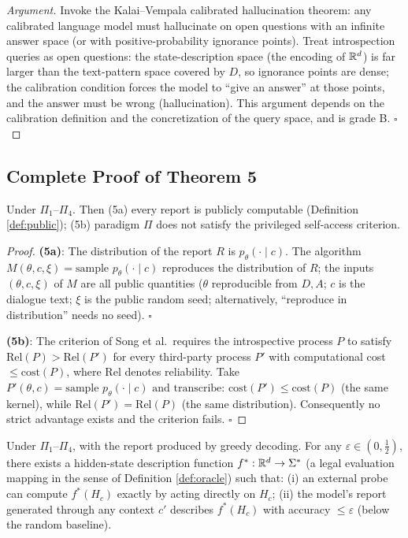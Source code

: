 \begin{proof}[Argument]
Invoke the Kalai--Vempala calibrated hallucination theorem\cite{kalai-vempala-2023-calib}:
any calibrated language model must hallucinate on open questions with an infinite answer space
(or with positive-probability ignorance points). Treat introspection queries as open
questions: the state-description space (the encoding of $\mathbb{R}^d$) is far larger than the
text-pattern space covered by $D$, so ignorance points are dense; the calibration condition
forces the model to ``give an answer'' at those points, and the answer must be wrong
(hallucination). This argument depends on the calibration definition and the
concretization of the query space, and is grade B. $\square$
\end{proof}

\subsection{Complete Proof of Theorem 5}

\begin{restate}[Theorems 5a/5b]
Under $\Pi_1$--$\Pi_4$. Then (5a) every report is publicly computable (Definition
\ref{def:public}); (5b) paradigm $\Pi$ does not satisfy the privileged self-access
criterion\cite{song-privileged-2025}.
\end{restate}

\begin{proof}
\textbf{(5a)}: The distribution of the report $R$ is $p_\theta(\cdot \mid c)$. The algorithm
$M(\theta, c, \xi) = \text{sample } p_\theta(\cdot\mid c)$ reproduces the distribution of
$R$; the inputs $(\theta, c, \xi)$ of $M$ are all public quantities ($\theta$ reproducible
from $D, A$; $c$ is the dialogue text; $\xi$ is the public random seed; alternatively, ``reproduce in
distribution'' needs no seed). $\square$

\textbf{(5b)}: The criterion of Song et al.\ requires the introspective process $P$ to satisfy
$\mathrm{Rel}(P) > \mathrm{Rel}(P')$ for every third-party process $P'$ with computational
cost $\le \mathrm{cost}(P)$, where $\mathrm{Rel}$ denotes reliability. Take
$P'(\theta, c) = \text{sample } p_\theta(\cdot\mid c) \text{ and transcribe}$:
$\mathrm{cost}(P') \le \mathrm{cost}(P)$ (the same kernel), while
$\mathrm{Rel}(P') = \mathrm{Rel}(P)$ (the same distribution). Consequently no strict advantage
exists and the criterion fails. $\square$
\end{proof}

\begin{restate}
Under $\Pi_1$--$\Pi_4$, with the report produced by greedy decoding. For any
$\varepsilon \in (0, \tfrac12)$, there exists a hidden-state description function
$f^{*}: \mathbb{R}^d \to \Sigma^{*}$ (a legal evaluation mapping in the sense of Definition
\ref{def:oracle}) such that: (i) an external probe can compute $f^{*}(H_c)$ exactly by acting
directly on $H_c$; (ii) the model's report generated through any context $c'$ describes
$f^{*}(H_c)$ with accuracy $\le \varepsilon$ (below the random baseline).
\end{restate}

